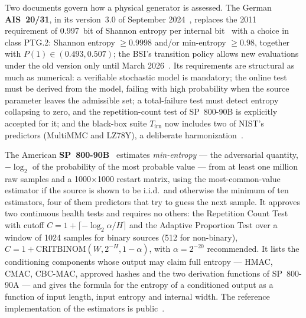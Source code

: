 Two documents govern how a physical generator is assessed. The German
\textbf{AIS~20/31}, in its version~3.0 of September 2024~\cite{peter_2024_ais31},
replaces the 2011 requirement of 0.997~bit of Shannon entropy per
internal bit~\cite{killmann_2011_ais31} with a choice in class PTG.2:
Shannon entropy $\ge0.9998$ and/or min-entropy $\ge0.98$, together with
$P(1)\in(0.493, 0.507)$; the BSI's transition policy allows new
evaluations under the old version only until March
2026~\cite{bsi_2025_transition}. Its requirements are structural as much
as numerical: a verifiable stochastic model is mandatory; the online test
must be derived from the model, failing with high probability when the
source parameter leaves the admissible set; a total-failure test must
detect entropy collapsing to zero, and the repetition-count test of
SP~800-90B is explicitly accepted for it; and the black-box suite
$T_{\mathrm{irn}}$ now includes two of NIST's predictors (MultiMMC and
LZ78Y), a deliberate harmonization~\cite{peter_2024_ais31, schindler_2024_ecw}.

The American \textbf{SP~800-90B}~\cite{turan_2018_sp80090b} estimates
\emph{min-entropy} --- the adversarial quantity, $-\log_2$ of the
probability of the most probable value --- from at least one million raw
samples and a
1000$\times$1000 restart matrix, using the most-common-value estimator
if the source is shown to be i.i.d.\ and otherwise the minimum of ten
estimators, four of them predictors that try to guess the next sample.
It approves two continuous health tests and requires no others: the
Repetition Count Test with cutoff $C=1+\lceil-\log_2\alpha/H\rceil$ and the
Adaptive Proportion Test over a window of 1024 samples for binary sources
(512 for non-binary), $C=1+\mathrm{CRITBINOM}(W,2^{-H},1-\alpha)$, with
$\alpha=2^{-20}$ recommended. It lists the conditioning components whose
output may claim full entropy --- HMAC, CMAC, CBC-MAC, approved hashes and
the two derivation functions of SP~800-90A --- and gives the formula for
the entropy of a conditioned output as a function of input length, input
entropy and internal width. The reference implementation of the
estimators is public~\cite{nist_ea_github}.

